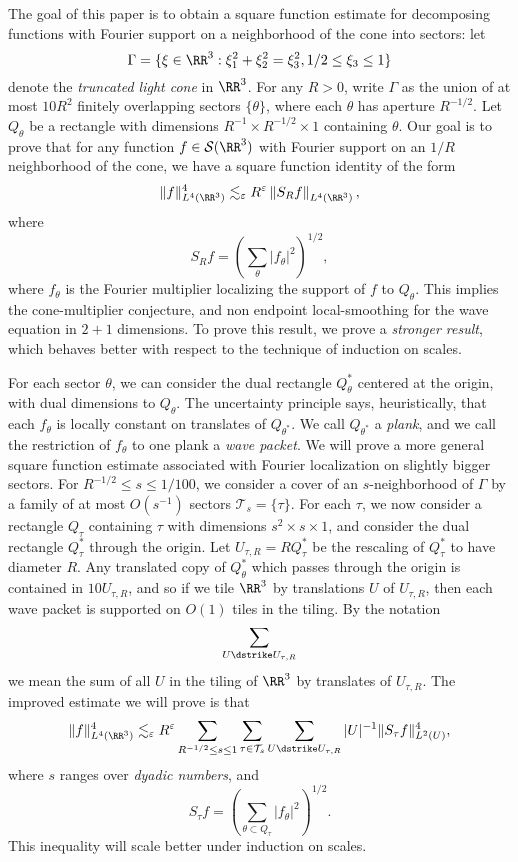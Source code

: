 The goal of this paper is to obtain a square function estimate for decomposing functions with Fourier support on a neighborhood of the cone into sectors: let
%
\[ \Gamma = \{ \xi \in \RR^3: \xi_1^2 + \xi_2^2 = \xi_3^2, 1/2 \leq \xi_3 \leq 1 \} \]
%
denote the \emph{truncated light cone} in $\RR^3$. For any $R > 0$, write $\Gamma$ as the union of at most $10 R^2$ finitely overlapping sectors $\{ \theta \}$, where each $\theta$ has aperture $R^{-1/2}$. Let $Q_\theta$ be a rectangle with dimensions $R^{-1} \times R^{-1/2} \times 1$ containing $\theta$. Our goal is to prove that for any function $f \in \mathcal{S}(\RR^3)$ with Fourier support on an $1/R$ neighborhood of the cone, we have a square function identity of the form
%
\[ \| f \|_{L^4(\RR^3)}^4 \lesssim_\varepsilon R^\varepsilon \left\| S_R f \right\|_{L^4(\RR^3)}, \]
%
where
%
\[ S_R f = \left( \sum_\theta |f_\theta|^2 \right)^{1/2}, \]
%
where $f_\theta$ is the Fourier multiplier localizing the support of $f$ to $Q_\theta$. This implies the cone-multiplier conjecture, and non endpoint local-smoothing for the wave equation in $2+1$ dimensions. To prove this result, we prove a \emph{stronger result}, which behaves better with respect to the technique of induction on scales.

For each sector $\theta$, we can consider the dual rectangle $Q^*_\theta$ centered at the origin, with dual dimensions to $Q_\theta$. The uncertainty principle says, heuristically, that each $f_\theta$ is locally constant on translates of $Q_{\theta^*}$. We call $Q_{\theta^*}$ a \emph{plank}, and we call the restriction of $f_\theta$ to one plank a \emph{wave packet}. We will prove a more general square function estimate associated with Fourier localization on slightly bigger sectors. For $R^{-1/2} \leq s \leq 1/100$, we consider a cover of an $s$-neighborhood of $\Gamma$ by a family of at most $O(s^{-1})$ sectors $\mathcal{T}_s = \{ \tau \}$. For each $\tau$, we now consider a rectangle $Q_\tau$ containing $\tau$ with dimensions $s^2 \times s \times 1$, and consider the dual rectangle $Q_\tau^*$ through the origin. Let $U_{\tau,R} = R Q_\tau^*$ be the rescaling of $Q_\tau^*$ to have diameter $R$. Any translated copy of $Q_\theta^*$ which passes through the origin is contained in $10 U_{\tau,R}$, and so if we tile $\RR^3$ by translations $U$ of $U_{\tau,R}$, then each wave packet is supported on $O(1)$ tiles in the tiling. By the notation
%
\[ \sum_{U \dstrike U_{\tau,R}} \]
%
we mean the sum of all $U$ in the tiling of $\RR^3$ by translates of $U_{\tau,R}$. The improved estimate we will prove is that
%
\[ \| f \|_{L^4(\RR^3)}^4 \lesssim_\varepsilon R^\varepsilon \sum_{R^{-1/2} \leq s \leq 1} \sum_{\tau \in \mathcal{T}_s} \sum_{U \dstrike U_{\tau,R}} |U|^{-1} \| S_\tau f \|_{L^2(U)}^4, \]
%
where $s$ ranges over \emph{dyadic numbers}, and
%
\[ S_\tau f = \left( \sum_{\theta \subset Q_\tau} |f_\theta|^2 \right)^{1/2}. \]
%
This inequality will scale better under induction on scales.

